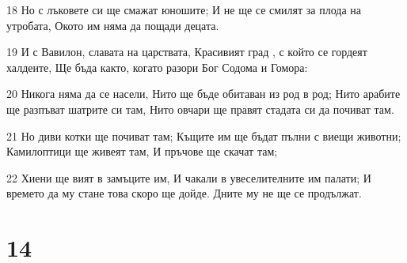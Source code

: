 \par 18 Но с лъковете си ще смажат юношите; И не ще се смилят за плода на утробата, Окото им няма да пощади децата.
\par 19 И с Вавилон, славата на царствата, Красивият град , с който се гордеят халдеите, Ще бъда както, когато разори Бог Содома и Гомора:
\par 20 Никога няма да се насели, Нито ще бъде обитаван из род в род; Нито арабите ще разпъват шатрите си там, Нито овчари ще правят стадата си да почиват там.
\par 21 Но диви котки ще почиват там; Къщите им ще бъдат пълни с виещи животни; Камилоптици ще живеят там, И пръчове ще скачат там;
\par 22 Хиени ще вият в замъците им, И чакали в увеселителните им палати; И времето да му стане това скоро ще дойде. Дните му не ще се продължат.

\chapter{14}

